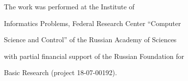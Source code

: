    




  












\Ack


\noindent


The work was performed at the Institute of 


Informatics Problems, Federal Research Center ``Computer 


Science and Control'' of the Russian Academy of Sciences


with partial financial support of the Russian Foundation for


Basic Research  (project  18-07-00192).





 








\renewcommand{\bibname}{\protect\rmfamily References}







